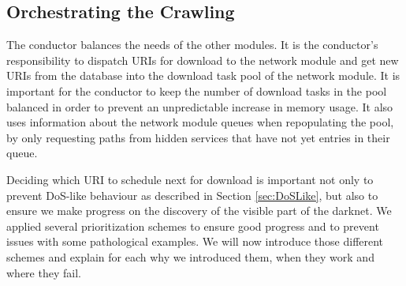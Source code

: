 \subsection{Orchestrating the Crawling}
The conductor balances the needs of the other modules. It is the conductor's responsibility to dispatch URIs for download to the network module and get new URIs from the database into the download task pool of the network module. It is important for the conductor to keep the number of download tasks in the pool balanced in order to prevent an unpredictable increase in memory usage. It also uses information about the network module queues when repopulating the pool, by only requesting paths from hidden services that have not yet entries in their queue.

\label{sec:prioritizationDownload}
Deciding which URI to schedule next for download is important not only to prevent DoS-like behaviour as described in Section \ref{sec:DoSLike}, but also to ensure we make progress on the discovery of the visible part of the darknet. We applied several prioritization schemes to ensure good progress and to prevent issues with some pathological examples. We will now introduce those different schemes and explain for each why we introduced them, when they work and where they fail. 

